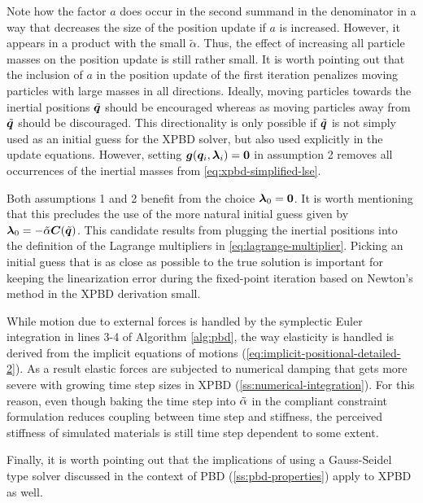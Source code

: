\noindent Note how the factor $a$ does occur in the second summand in the denominator in a way that decreases the size of the position update
if $a$ is increased. However, it appears in a product with the small $\tilde{\alpha}$. Thus, the effect of increasing all particle masses on
the position update is still rather small. It is worth pointing out that the inclusion of $a$ in the position update of the first iteration
penalizes moving particles with large masses in all directions. Ideally, moving particles towards the inertial positions $\tilde{\bm{q}}$
should be encouraged whereas as moving particles away from $\tilde{\bm{q}}$ should be discouraged. This directionality is only possible if
$\tilde{\bm{q}}$ is not simply used as an initial guess for the XPBD solver, but also used explicitly in the update equations. However, setting
$\bm{g}(\bm{q}_i, \bm{\lambda}_i) = \bm{0}$ in assumption 2 removes all occurrences of the inertial masses from \autoref{eq:xpbd-simplified-lse}.

Both assumptions 1 and 2 benefit from the choice $\bm{\lambda}_0 = \bm{0}$. It is worth mentioning that this precludes the use of the more natural
initial guess given by $\bm{\lambda}_0 = -\tilde{\mathbf{\alpha}} \bm{C}(\tilde{\bm{q}})$. This candidate results from plugging the 
inertial positions into the
definition of the Lagrange multipliers in \autoref{eq:lagrange-multiplier}. Picking an initial guess that is as close as possible to the true
solution is important for keeping the linearization error during the fixed-point iteration based on Newton's method in the XPBD derivation 
small. 

While motion due to external forces is handled by the symplectic Euler integration in lines 3-4 of Algorithm \ref{alg:pbd}, the way 
elasticity is handled is derived from the implicit equations of motions (\cref{eq:implicit-positional-detailed-2}). As a result 
elastic forces are subjected to numerical damping that gets more severe with growing time step sizes in XPBD (\cref{ss:numerical-integration}). 
For this reason, even though baking the time step into $\tilde{\mathbf{\alpha}}$ in the compliant constraint formulation reduces coupling 
between time step and stiffness, the perceived stiffness of simulated materials is still time step dependent to some extent.

Finally, it is worth pointing out that the implications of using a Gauss-Seidel type solver discussed in the context of PBD 
(\cref{ss:pbd-properties}) apply to XPBD as well.

